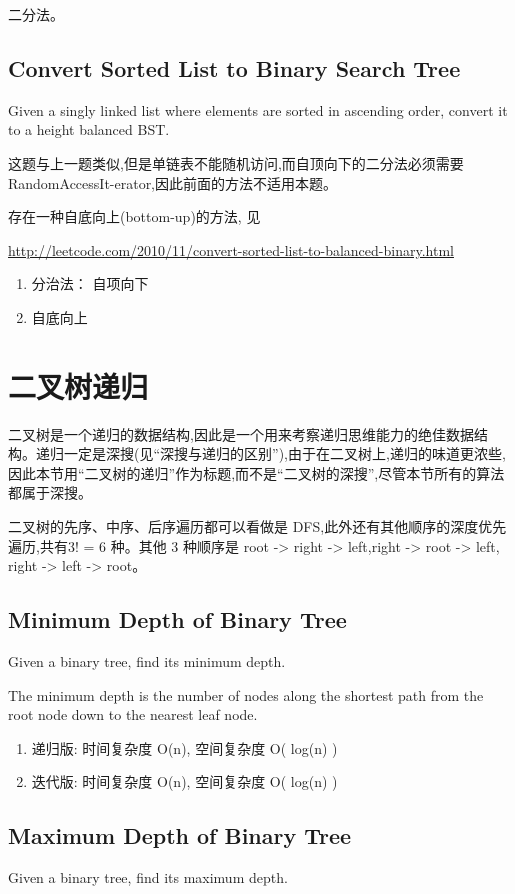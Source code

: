 \documentclass[12pt]{book}
\begin{document}
二分法。
\subsection{Convert Sorted List to Binary Search Tree}
\label{sec-4-3-3}
Given a singly linked list where elements are sorted in ascending order, convert it to a height balanced BST.

这题与上一题类似,但是单链表不能随机访问,而自顶向下的二分法必须需要 RandomAccessIt-erator,因此前面的方法不适用本题。

存在一种自底向上(bottom-up)的方法, 见 

\url{http://leetcode.com/2010/11/convert-sorted-list-to-balanced-binary.html}
\begin{enumerate}
\item 分治法： 自项向下
\label{sec-4-3-3-1}
\item 自底向上
\label{sec-4-3-3-2}
\end{enumerate}
\section{二叉树递归}
\label{sec-4-4}
二叉树是一个递归的数据结构,因此是一个用来考察递归思维能力的绝佳数据结构。递归一定是深搜(见“深搜与递归的区别”),由于在二叉树上,递归的味道更浓些,因此本节用“二叉树的递归”作为标题,而不是“二叉树的深搜”,尽管本节所有的算法都属于深搜。

二叉树的先序、中序、后序遍历都可以看做是 DFS,此外还有其他顺序的深度优先遍历,共有3! = 6 种。其他 3 种顺序是 root -> right -> left,right -> root -> left, right -> left -> root。
\subsection{Minimum Depth of Binary Tree}
\label{sec-4-4-1}
Given a binary tree, find its minimum depth.

The minimum depth is the number of nodes along the shortest path from the root node down to the nearest leaf node.
\begin{enumerate}
\item 递归版: 时间复杂度 O(n), 空间复杂度 O( log(n) )
\label{sec-4-4-1-1}
\item 迭代版: 时间复杂度 O(n), 空间复杂度 O( log(n) )
\label{sec-4-4-1-2}
\end{enumerate}

\subsection{Maximum Depth of Binary Tree}
\label{sec-4-4-2}
Given a binary tree, find its maximum depth.
\end{document}
